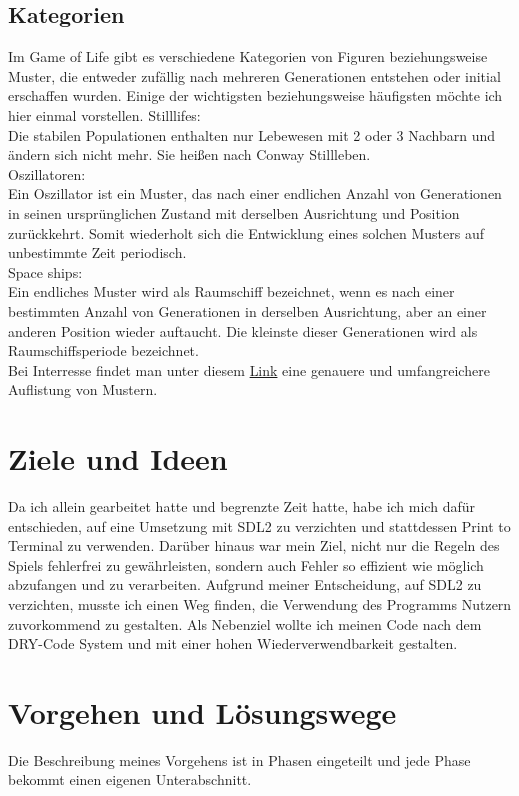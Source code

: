 \documentclass[11pt]{scrartcl}
\begin{document}
\subsection{Kategorien}
Im Game of Life gibt es verschiedene Kategorien von Figuren beziehungsweise Muster, die entweder zufällig nach mehreren Generationen entstehen oder initial erschaffen wurden. Einige der wichtigsten beziehungsweise häufigsten möchte ich hier einmal vorstellen.
Stilllifes:\\
Die stabilen Populationen enthalten nur Lebewesen mit 2 oder 3 Nachbarn und ändern sich nicht mehr. Sie hei\ss en nach Conway Stillleben.\\
Oszillatoren:\\
Ein Oszillator ist ein Muster, das nach einer endlichen Anzahl von Generationen in seinen ursprünglichen Zustand mit derselben Ausrichtung und Position zurückkehrt. Somit wiederholt sich die Entwicklung eines solchen Musters auf unbestimmte Zeit periodisch.\\
Space ships:\\
Ein endliches Muster wird als Raumschiff bezeichnet, wenn es nach einer bestimmten Anzahl von Generationen in derselben Ausrichtung, aber an einer anderen Position wieder auftaucht. Die kleinste dieser Generationen wird als Raumschiffsperiode bezeichnet.\\
Bei Interresse findet man unter diesem \href{https://en.wikipedia.org/wiki/Conway\%27s_Game_of_Life#Examples_of_patterns}{Link} eine genauere und umfangreichere Auflistung von Mustern.
%
\section{Ziele und Ideen}
Da ich allein gearbeitet hatte und begrenzte Zeit hatte, habe ich mich dafür entschieden, auf eine Umsetzung mit SDL2 zu verzichten und stattdessen Print to Terminal zu verwenden. Darüber hinaus war mein Ziel, nicht nur die Regeln des Spiels fehlerfrei zu gewährleisten, sondern auch Fehler so effizient wie möglich abzufangen und zu verarbeiten. Aufgrund meiner Entscheidung, auf SDL2 zu verzichten, musste ich einen Weg finden, die Verwendung des Programms Nutzern zuvorkommend zu gestalten. Als Nebenziel wollte ich meinen Code nach dem DRY-Code System und mit einer hohen Wiederverwendbarkeit gestalten.
\section{Vorgehen und Lösungswege}
Die Beschreibung meines Vorgehens ist in Phasen eingeteilt und jede Phase bekommt einen eigenen Unterabschnitt.
\end{document}
